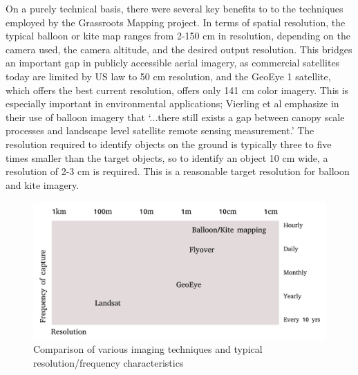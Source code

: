 \documentclass[11pt]{report}
\begin{document}
On a purely technical basis, there were several key benefits to to the techniques employed by the Grassroots Mapping project. In terms of spatial resolution, the typical balloon or kite map ranges from 2-150 cm in resolution, depending on the camera used, the camera altitude, and the desired output resolution. This bridges an important gap in publicly accessible aerial imagery, as commercial satellites today are limited by US law to 50 cm resolution, and the GeoEye 1 satellite, which offers the best current resolution, offers only 141 cm color imagery. This is especially important in environmental applications; Vierling et al emphasize in their use of balloon imagery that `...there still exists a gap between canopy scale processes and landscape level satellite remote sensing measurement.' \cite{vierling2006short} The resolution required to identify objects on the ground is typically three to five times smaller than the target objects, so to identify an object 10 cm wide, a resolution of 2-3 cm is required. \cite{aber2002unmanned} This is a reasonable target resolution for balloon and kite imagery. 


\begin{figure}[h]
  \begin{center}
	\includegraphics[width=1\textwidth]{diagrams/resolution-frequency.pdf}
	\caption{Comparison of various imaging techniques and typical resolution/frequency characteristics}
  \end{center}
\end{figure}
\end{document}

